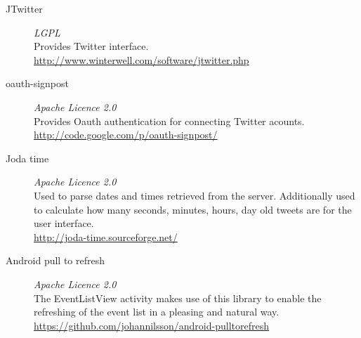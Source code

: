 \begin{description}
    \item[JTwitter] \emph{LGPL} \hfill \\
        Provides Twitter interface.\\
        \url{http://www.winterwell.com/software/jtwitter.php}
    \item[oauth-signpost] \emph{Apache Licence 2.0} \hfill \\
        Provides Oauth authentication for connecting Twitter acounts.\\
        \url{http://code.google.com/p/oauth-signpost/}
    \item[Joda time] \emph{Apache Licence 2.0} \hfill \\
        Used to parse dates and times retrieved from the server. Additionally
        used to calculate how many seconds, minutes, hours, day old tweets are
        for the user interface.\\
        \url{http://joda-time.sourceforge.net/}
    \item[Android pull to refresh] \emph{Apache Licence 2.0} \hfill \\
        The EventListView activity makes use of this library to enable the
        refreshing of the event list in a pleasing and natural way.\\
        \url{https://github.com/johannilsson/android-pulltorefresh}
\end{description}
